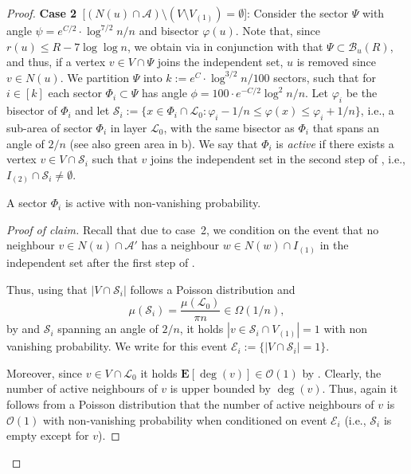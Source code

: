 \documentclass[letterpaper,11pt]{article}
\newcommand{\E}[1]{\mathbf{E}\left[#1\right]}
\newcommand{\B}{\mathcal B}
\newcommand{\1}{\mathbb I}
\newcommand{\bigO}{\mathcal{O}}
\newcommand{\Layer}[1]{\mathcal{L}_{#1}}
\begin{document}
\begin{proof}
\smallskip

\textbf{Case 2}~[$(N(u) \cap \mathcal{A})\setminus (V \setminus V_{(1)}) = \emptyset$]: Consider the sector $\Psi$ with angle $\psi = e^{C/2} \cdot \log^{7/2} n /n$ and bisector $\varphi(u)$. Note that, since $r(u) \leq R - 7\log\log n$, we obtain via  in conjunction with  that $\Psi \subset \B_u(R)$, and thus, if a vertex $v \in V \cap \Psi$ joins the independent set, $u$ is removed since $v \in N(u)$. We partition $\Psi$ into $k:= e^{C}\cdot\log^{3/2}n / 100$ sectors, such that for $i \in [k]$ each sector $\Phi_i \subset \Psi$ has angle $\phi = 100\cdot e^{-C/2}\log^2 n /n$. Let $\varphi_i$ be the bisector of $\Phi_i$ and let $\mathcal{S}_i := \{x \in \Phi_i \cap \Layer{0} : \varphi_i - 1/n \leq \varphi(x) \leq \varphi_i + 1/n \}$, i.e., a sub-area of sector $\Phi_i$ in layer $\Layer{0}$, with the same bisector as $\Phi_i$ that spans an angle of $2/n$ (see also green area in b). We say that $\Phi_i$ is \emph{active} if there exists a vertex $v \in V \cap \mathcal{S}_i$ such that $v$ joins the independent set in the second step of \algo, i.e., $I_{(2)} \cap \mathcal{S}_i \neq \emptyset$.
%
\begin{claim}\label{claim:active-sector2}
    A sector $\Phi_i$ is active with non-vanishing probability.
\end{claim}
%
{
\renewcommand{\qedsymbol}{$\blacksquare$} %
\begin{proof}[Proof of claim]
%
Recall that due to case~2, we condition on the event that no neighbour $v \in N(u) \cap \mathcal{A}'$ has a neighbour $w \in N(w) \cap I_{(1)}$ in the independent set after the first step of \algo. 

Thus, using that $|V \cap \mathcal{S}_i|$ follows a Poisson distribution and $$\mu(\mathcal{S}_i) =  \frac{\mu(\Layer{0})}{\pi n} \in \Omega(1/n),$$ by  and $\mathcal{S}_i$ spanning an angle of $2/n$, it holds $|v \in \mathcal{S}_i \cap V_{(1)}| = 1$ with non vanishing probability. We write for this event $\mathcal{E}_i := \{|V \cap \mathcal{S}_i| =1\}$.

Moreover, since $v \in V \cap \Layer{0}$ it holds $\E{\deg(v)} \in \bigO(1)$ by . Clearly, the number of active neighbours of $v$ is upper bounded by $\deg(v)$. Thus, again it follows from a Poisson distribution that the number of active neighbours of $v$ is $\bigO(1)$ with non-vanishing probability when conditioned on event $\mathcal{E}_i$ (i.e., $\mathcal{S}_i$ is empty except for $v$).


\end{proof}}
\end{proof}
\end{document}
